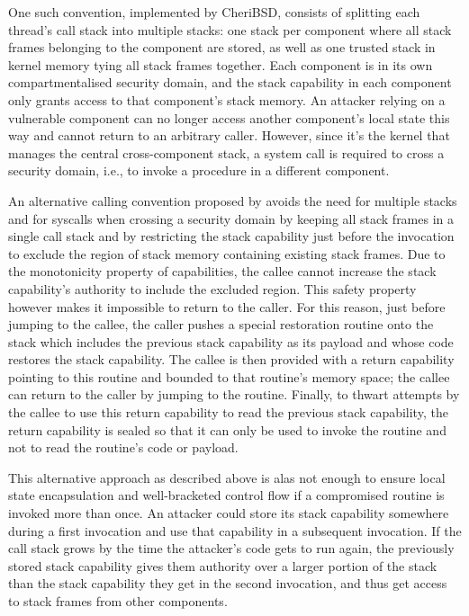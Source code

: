 \documentclass[main.tex]{subfiles}
\begin{document}
One such convention, implemented by CheriBSD, consists of splitting each thread’s call stack into multiple stacks: one stack per component where all stack frames belonging to the component are stored, as well as one trusted stack in kernel memory tying all stack frames together. Each component is in its own compartmentalised security domain, and the stack capability in each component only grants access to that component’s stack memory. An attacker relying on a vulnerable component can no longer access another component’s local state this way and cannot return to an arbitrary caller. However, since it’s the kernel that manages the central cross-component stack, a system call is required to cross a security domain, i.e., to invoke a procedure in a different component.

An alternative calling convention proposed by \cite{retptr} avoids the need for multiple stacks and for syscalls when crossing a security domain by keeping all stack frames in a single call stack and by restricting the stack capability just before the invocation to exclude the region of stack memory containing existing stack frames. Due to the monotonicity property of capabilities, the callee cannot increase the stack capability’s authority to include the excluded region. This safety property however makes it impossible to return to the caller. For this reason, just before jumping to the callee, the caller pushes a special restoration routine onto the stack which includes the previous stack capability as its payload and whose code restores the stack capability. The callee is then provided with a return capability pointing to this routine and bounded to that routine’s memory space; the callee can return to the caller by jumping to the routine. Finally, to thwart attempts by the callee to use this return capability to read the previous stack capability, the return capability is sealed so that it can only be used to invoke the routine and not to read the routine’s code or payload.

This alternative approach as described above is alas not enough to ensure local state encapsulation and well-bracketed control flow if a compromised routine is invoked more than once. An attacker could store its stack capability somewhere during a first invocation and use that capability in a subsequent invocation. If the call stack grows by the time the attacker’s code gets to run again, the previously stored stack capability gives them authority over a larger portion of the stack than the stack capability they get in the second invocation, and thus get access to stack frames from other components.
\end{document}
